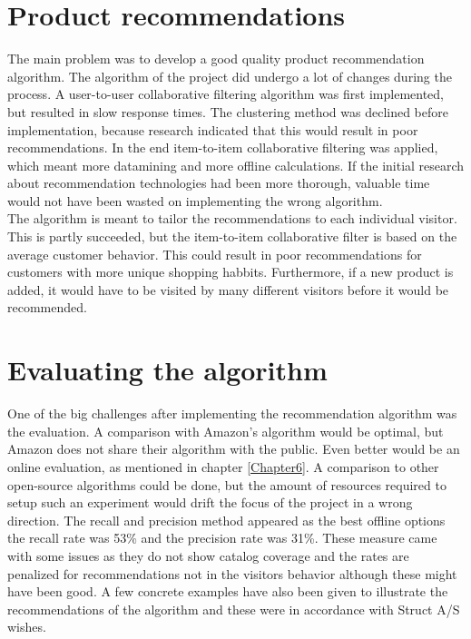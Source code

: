 \section{Product recommendations}
The main problem was to develop a good quality product recommendation algorithm. The algorithm of the project did undergo a lot of changes during the process. A user-to-user collaborative filtering algorithm was first implemented, but resulted in slow response times. The clustering method was declined before implementation, because research indicated that this would result in poor recommendations. \cite{AmazonRecommendations} In the end item-to-item collaborative filtering was applied, which meant more datamining and more offline calculations. If the initial research about recommendation technologies had been more thorough, valuable time would not have been wasted on implementing the wrong algorithm. \\
The algorithm is meant to tailor the recommendations to each individual visitor. This is partly succeeded, but the item-to-item collaborative filter is based on the average customer behavior. This could result in poor recommendations for customers with more unique shopping habbits. Furthermore, if a new product is added, it would have to be visited by many different visitors before it would be recommended.

\section{Evaluating the algorithm}
One of the big challenges after implementing the recommendation algorithm was the evaluation. A comparison with Amazon's algorithm would be optimal, but Amazon does not share their algorithm with the public. Even better would be an online evaluation, as mentioned in chapter \ref{Chapter6}. A comparison to other open-source algorithms could be done, but the amount of resources required to setup such an experiment would drift the focus of the project in a wrong direction. The recall and precision method appeared as the best offline options the recall rate was 53\% and the precision rate was 31\%. These measure came with some issues as they do not show catalog coverage and the rates are penalized for recommendations not in the visitors behavior although these might have been good. A few concrete examples have also been given to illustrate the recommendations of the algorithm and these were in accordance with Struct A/S wishes. 